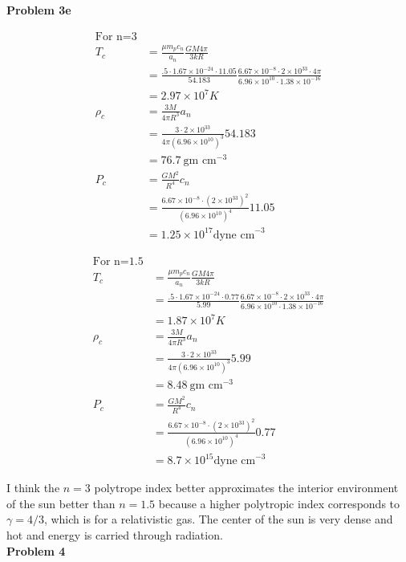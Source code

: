 \documentclass[10pt,a4paper]{article}
\begin{document}
\large{\textbf{Problem 3e}}

\begin{align*}
\text{For n=3}\\
T_c & =\frac{\mu m_p c_n}{a_n} \frac{GM 4 \pi}{3kR}\\
& = \frac{.5 \cdot 1.67 \times10^{-24} \cdot 11.05}{54.183} \frac{6.67 \times 10^{-8}\cdot 2 \times 10^{33} \cdot 4\pi}{6.96 \times 10^{10} \cdot 1.38 \times 10^{-16}}\\
& = 2.97 \times10^7 K\\
\rho_c & = \frac{3M}{4 \pi R^3}a_n\\
& = \frac{3 \cdot 2 \times 10^{33}}{4 \pi (6.96 \times 10^{10})^3}54.183\\
& = 76.7~ \text{gm cm}^{-3}\\
P_c & = \frac{GM^2}{R^4}c_n\\
& = \frac{6.67 \times 10^{-8} \cdot (2 \times 10^{33})^2}{(6.96 \times 10^{10})^4}11.05\\
& = 1.25 \times10^{17} \text{dyne cm}^{-3}
\end{align*}

\begin{align*}
\text{For n=1.5}\\
T_c & =\frac{\mu m_p c_n}{a_n} \frac{GM 4 \pi}{3kR}\\
& = \frac{.5 \cdot 1.67 \times10^{-24} \cdot 0.77}{5.99} \frac{6.67 \times 10^{-8}\cdot 2 \times 10^{33} \cdot 4\pi}{6.96 \times 10^{10} \cdot 1.38 \times 10^{-16}}\\
& = 1.87 \times10^7 K\\
\rho_c & = \frac{3M}{4 \pi R^3}a_n\\
& = \frac{3 \cdot 2 \times 10^{33}}{4 \pi (6.96 \times 10^{10})^3}5.99\\
& = 8.48~ \text{gm cm}^{-3}\\
P_c & = \frac{GM^2}{R^4}c_n\\
& = \frac{6.67 \times 10^{-8} \cdot (2 \times 10^{33})^2}{(6.96 \times 10^{10})^4}0.77\\
& = 8.7 \times10^{15} \text{dyne cm}^{-3}
\end{align*}

I think the $n=3$ polytrope index better approximates the interior environment of the sun better than $n=1.5$ because a higher polytropic index corresponds to $\gamma = 4/3$, which is for a relativistic gas. The center of the sun is very dense and hot and energy is carried through radiation. \\

\large{\textbf{Problem 4}}
\end{document}
